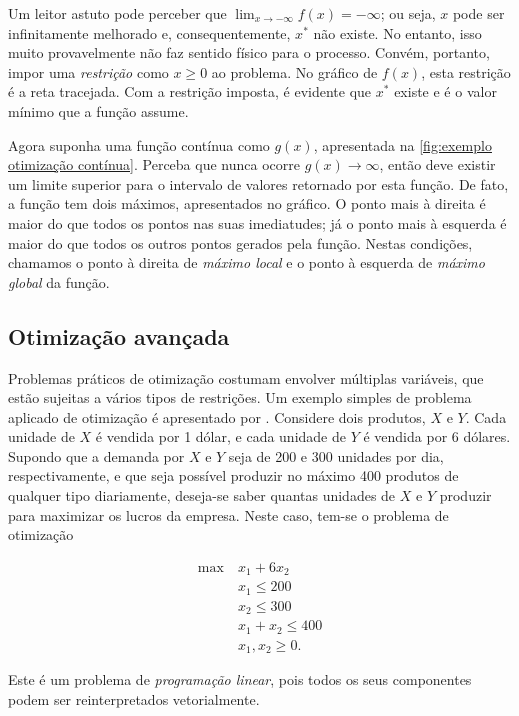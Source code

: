 Um leitor astuto pode perceber que $\lim_{x\to-\infty} f(x) = -\infty$; ou seja, $x$ pode ser infinitamente melhorado e, consequentemente, $x^\ast$ não existe. No entanto, isso muito provavelmente não faz sentido físico para o processo. Convém, portanto, impor uma \emph{restrição} como $x \geq 0$ ao problema. No gráfico de $f(x)$, esta restrição é a reta tracejada. Com a restrição imposta, é evidente que $x^\ast$ existe e é o valor mínimo que a função assume.

Agora suponha uma função contínua como $g(x)$, apresentada na \cref{fig:exemplo otimização contínua}. Perceba que nunca ocorre $g(x) \to \infty$, então deve existir um limite superior para o intervalo de valores retornado por esta função. De fato, a função tem dois máximos, apresentados no gráfico. O ponto mais à direita é maior do que todos os pontos nas suas imediatudes; já o ponto mais à esquerda é maior do que todos os outros pontos gerados pela função. Nestas condições, chamamos o ponto à direita de \emph{máximo local} e o ponto à esquerda de \emph{máximo global} da função.

\subsection{Otimização avançada}

Problemas práticos de otimização costumam envolver múltiplas variáveis, que estão sujeitas a vários tipos de restrições. Um exemplo simples de problema aplicado de otimização é apresentado por \textcite{ZHANG2020}. Considere dois produtos, $X$ e $Y$. Cada unidade de $X$ é vendida por 1 dólar, e cada unidade de $Y$ é vendida por 6 dólares. Supondo que a demanda por $X$ e $Y$ seja de 200 e 300 unidades por dia, respectivamente, e que seja possível produzir no máximo 400 produtos de qualquer tipo diariamente, deseja-se saber quantas unidades de $X$ e $Y$ produzir para maximizar os lucros da empresa. Neste caso, tem-se o problema de otimização

\begin{align}
    \max\ & x_1 + 6x_2\\
    & x_1 \leq 200\\
    & x_2 \leq 300\\
    & x_1 + x_2 \leq 400\\
    & x_1, x_2 \geq 0.
\end{align}

Este é um problema de \emph{programação linear}, pois todos os seus componentes podem ser reinterpretados vetorialmente.